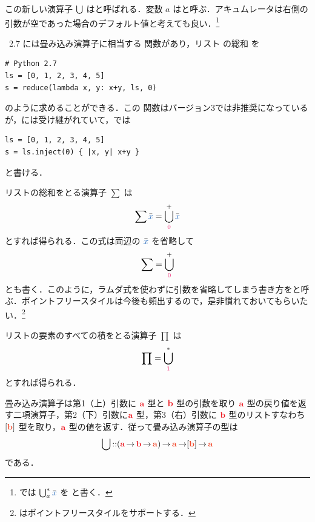 \documentclass[a5paper,twoside,fleqn,draft]{jsbook}
\begin{document}
この新しい演算子 $\operatorname*{\bigcup}$ はと呼ばれる．変数 $a$ はと呼ぶ．アキュムレータは右側の引数が空であった場合のデフォルト値と考えても良い．\footnote{\haskell では $\mFold^*_a\hListVarWith{x}$ を  と書く．}

\python\ 2.7 には畳み込み演算子に相当する  関数があり，リスト  の総和  を
\begin{pythoncode}
\begin{verbatim}
# Python 2.7
ls = [0, 1, 2, 3, 4, 5]
s = reduce(lambda x, y: x+y, ls, 0)
\end{verbatim}
\end{pythoncode}
のように求めることができる．この  関数は\python バージョン3では非推奨になっているが，\ruby には受け継がれていて，\ruby では
\begin{rubycode}
\begin{verbatim}
ls = [0, 1, 2, 3, 4, 5]
s = ls.inject(0) { |x, y| x+y }
\end{verbatim}
\end{rubycode}
と書ける．

リストの総和をとる演算子 $\sum$ は
\begin{equation}
  \sum\hListVarWith{x}
  =\mFold^+_{\hConstant{0}}\hListVarWith{x}
\end{equation}
とすれば得られる．この式は両辺の $\hListVarWith{x}$ を省略して
\begin{equation}
  \sum
  =\mFold^+_{\hConstant{0}}
\end{equation}
とも書く．このように，ラムダ式を使わずに引数を省略してしまう書き方をと呼ぶ．ポイントフリースタイルは今後も頻出するので，是非慣れておいてもらいたい．\footnote{\haskell はポイントフリースタイルをサポートする．}

リストの要素のすべての積をとる演算子 $\prod$ は
\begin{equation}
  \prod
  =\mFold^*_{\hConstant{1}}
\end{equation}
とすれば得られる．

畳み込み演算子は第1（上）引数に $\hTypeName{a}$ 型と $\hTypeName{b}$ 型の引数を取り $\hTypeName{a}$ 型の戻り値を返す二項演算子，第2（下）引数に$\hTypeName{a}$ 型，第3（右）引数に $\hTypeName{b}$ 型のリストすなわち$[\mB]$ 型を取り，$\hTypeName{a}$ 型の値を返す．従って畳み込み演算子の型は
\begin{equation}
  \mFold
  \hIsTypeOf(\hTypeName{a}\hFunctionArrow\hTypeName{b}\hFunctionArrow\mA)
  \hFunctionArrow\mA
  \hFunctionArrow[\mB]
  \hFunctionArrow\mA
\end{equation}
である．
\end{document}
